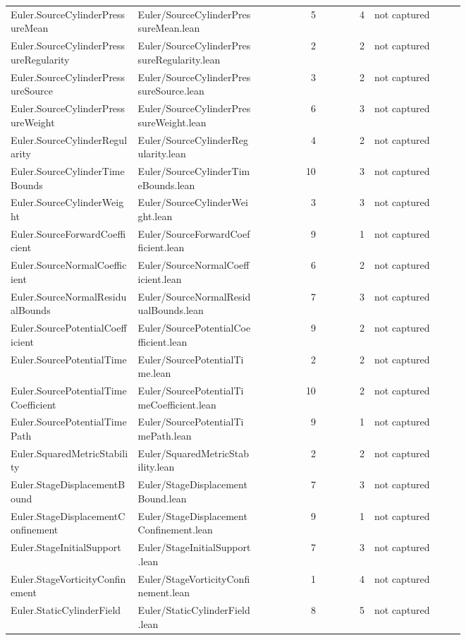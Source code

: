 \documentclass[10pt]{article}
\begin{document}
\begin{longtable}{p{0.28\linewidth}p{0.27\linewidth}r r p{0.20\linewidth}}
Euler.SourceCylinderPressureMean & Euler/SourceCylinderPressureMean.lean & 5 & 4 & not captured\\
Euler.SourceCylinderPressureRegularity & Euler/SourceCylinderPressureRegularity.lean & 2 & 2 & not captured\\
Euler.SourceCylinderPressureSource & Euler/SourceCylinderPressureSource.lean & 3 & 2 & not captured\\
Euler.SourceCylinderPressureWeight & Euler/SourceCylinderPressureWeight.lean & 6 & 3 & not captured\\
Euler.SourceCylinderRegularity & Euler/SourceCylinderRegularity.lean & 4 & 2 & not captured\\
Euler.SourceCylinderTimeBounds & Euler/SourceCylinderTimeBounds.lean & 10 & 3 & not captured\\
Euler.SourceCylinderWeight & Euler/SourceCylinderWeight.lean & 3 & 3 & not captured\\
Euler.SourceForwardCoefficient & Euler/SourceForwardCoefficient.lean & 9 & 1 & not captured\\
Euler.SourceNormalCoefficient & Euler/SourceNormalCoefficient.lean & 6 & 2 & not captured\\
Euler.SourceNormalResidualBounds & Euler/SourceNormalResidualBounds.lean & 7 & 3 & not captured\\
Euler.SourcePotentialCoefficient & Euler/SourcePotentialCoefficient.lean & 9 & 2 & not captured\\
Euler.SourcePotentialTime & Euler/SourcePotentialTime.lean & 2 & 2 & not captured\\
Euler.SourcePotentialTimeCoefficient & Euler/SourcePotentialTimeCoefficient.lean & 10 & 2 & not captured\\
Euler.SourcePotentialTimePath & Euler/SourcePotentialTimePath.lean & 9 & 1 & not captured\\
Euler.SquaredMetricStability & Euler/SquaredMetricStability.lean & 2 & 2 & not captured\\
Euler.StageDisplacementBound & Euler/StageDisplacementBound.lean & 7 & 3 & not captured\\
Euler.StageDisplacementConfinement & Euler/StageDisplacementConfinement.lean & 9 & 1 & not captured\\
Euler.StageInitialSupport & Euler/StageInitialSupport.lean & 7 & 3 & not captured\\
Euler.StageVorticityConfinement & Euler/StageVorticityConfinement.lean & 1 & 4 & not captured\\
Euler.StaticCylinderField & Euler/StaticCylinderField.lean & 8 & 5 & not captured\\

\end{longtable}
\end{document}

